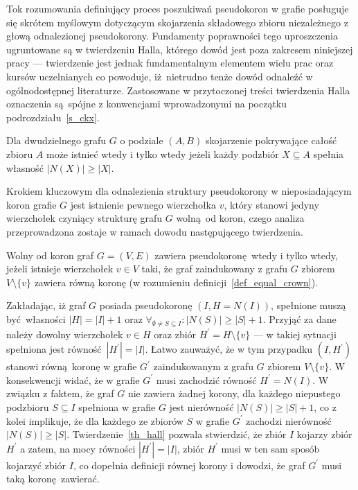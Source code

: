 \par{
  Tok rozumowania definiujący proces poszukiwań pseudokoron w grafie posługuje się skrótem myślowym dotyczącym skojarzenia składowego zbioru niezależnego z głową odnalezionej pseudokorony. 
  Fundamenty poprawności tego uproszczenia ugruntowane są w twierdzeniu Halla, którego dowód jest poza zakresem niniejszej pracy --- twierdzenie jest jednak fundamentalnym elementem wielu prac oraz kursów uczelnianych co powoduje, iż nietrudno tenże dowód odnaleźć w ogólnodostępnej literaturze.
  Zastosowane w przytoczonej treści twierdzenia Halla oznaczenia są spójne z konwencjami wprowadzonymi na początku podrozdziału~\ref{s_ckx}.
  \begin{theorem}
    Dla dwudzielnego grafu $G$ o podziale $(A, B)$ skojarzenie pokrywające całość zbioru $A$ może istnieć wtedy i tylko wtedy jeżeli każdy podzbiór $X \subseteq A$ spełnia własność $|N(X)| \geq |X|$.
  \end{theorem}

  Krokiem kluczowym dla odnalezienia struktury pseudokorony w nieposiadającym koron grafie $G$ jest istnienie pewnego wierzchołka $v$, który stanowi jedyny wierzchołek czyniący strukturę grafu $G$ wolną od koron, czego analiza przeprowadzona zostaje w ramach dowodu następującego twierdzenia.

  \begin{theorem}
    Wolny od koron graf $G=(V, E)$ zawiera pseudokoronę wtedy i tylko wtedy, jeżeli istnieje wierzchołek $v \in V$ taki, że graf zaindukowany z grafu $G$ zbiorem $V\setminus \{v\}$ zawiera równą koronę (w rozumieniu definicji~\ref{def_equal_crown}).
  \end{theorem}
  \begin{bproof}
    Zakładając, iż graf $G$ posiada pseudokoronę $(I, H=N(I))$, spełnione muszą być własności $|H| = |I| + 1$ oraz $\forall_{\emptyset\neq S \subseteq I}:{|N(S)|\geq|S|+1}$.
    Przyjąć za dane należy dowolny wierzchołek $v \in H$ oraz zbiór $H^\prime=H \setminus \{v\}$ --- w takiej sytuacji spełniona jest równość $|H^\prime|=|I|$.
    Łatwo zauważyć, że w tym przypadku $(I, H^\prime)$ stanowi równą koronę w grafie $G^\prime$ zaindukowanym z grafu $G$ zbiorem $V \setminus \{v\}$.
    W konsekwencji widać, że w grafie $G^\prime$ musi zachodzić równość $H^\prime = N(I)$.
    W związku z faktem, że graf $G$ nie zawiera żadnej korony, dla każdego niepustego podzbioru $S \subseteq I$ spełniona w grafie $G$ jest nierówność $|N(S)| \geq |S|+1$, co z kolei implikuje, że dla każdego ze zbiorów $S$  w grafie $G^\prime$ zachodzi nierówność $|N(S)| \geq |S|$.
    Twierdzenie~\ref{th_hall} pozwala stwierdzić, że zbiór $I$ kojarzy zbiór $H^\prime$ a zatem, na mocy równości $|H^\prime|=|I|$, zbiór $H^\prime$ musi w ten sam sposób kojarzyć zbiór $I$, co dopełnia definicji równej korony i dowodzi, że graf $G^\prime$ musi taką koronę zawierać.


\end{bproof}}
